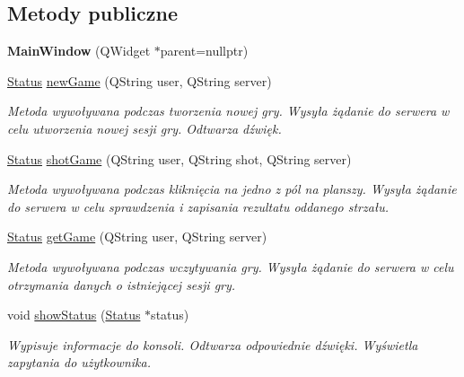 \subsection*{Metody publiczne}
\begin{DoxyCompactItemize}
\item 
\mbox{\label{classMainWindow_a996c5a2b6f77944776856f08ec30858d}} 
{\bfseries Main\+Window} (Q\+Widget $\ast$parent=nullptr)
\item 
\mbox{\hyperlink{classStatus}{Status}} \mbox{\hyperlink{classMainWindow_aebbc3ce8ecac3db6b5aba3b844fc3afb}{new\+Game}} (Q\+String user, Q\+String server)
\begin{DoxyCompactList}\small\item\em Metoda wywoływana podczas tworzenia nowej gry. Wysyła żądanie do serwera w celu utworzenia nowej sesji gry. Odtwarza dźwięk. \end{DoxyCompactList}\item 
\mbox{\hyperlink{classStatus}{Status}} \mbox{\hyperlink{classMainWindow_a1cbb495e0fca342d703fb18e5dd82b3d}{shot\+Game}} (Q\+String user, Q\+String shot, Q\+String server)
\begin{DoxyCompactList}\small\item\em Metoda wywoływana podczas kliknięcia na jedno z pól na planszy. Wysyła żądanie do serwera w celu sprawdzenia i zapisania rezultatu oddanego strzału. \end{DoxyCompactList}\item 
\mbox{\hyperlink{classStatus}{Status}} \mbox{\hyperlink{classMainWindow_a86257929f80454cadd0a45a87e28497f}{get\+Game}} (Q\+String user, Q\+String server)
\begin{DoxyCompactList}\small\item\em Metoda wywoływana podczas wczytywania gry. Wysyła żądanie do serwera w celu otrzymania danych o istniejącej sesji gry. \end{DoxyCompactList}\item 
void \mbox{\hyperlink{classMainWindow_a7a7aa4e930aeb02af314b919a7a6e8f9}{show\+Status}} (\mbox{\hyperlink{classStatus}{Status}} $\ast$status)
\begin{DoxyCompactList}\small\item\em Wypisuje informacje do konsoli. Odtwarza odpowiednie dźwięki. Wyświetla zapytania do użytkownika. \end{DoxyCompactList}\end{DoxyCompactItemize}
